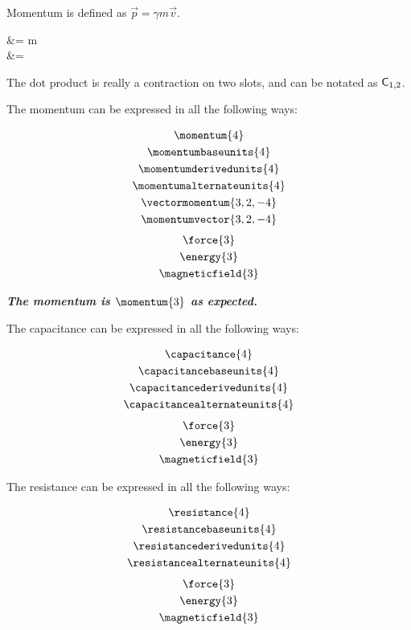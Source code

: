 \documentclass{article}
\begin{document}
Momentum is defined as \( \vec{p} = \gamma m\vec{v}\).

\begin{physicssolution}
   &= \gamma m   \\
   &=  
\end{physicssolution}

The dot product is really a contraction on two slots, and can be notated 
as \( \contraction*{1,2} \).

\newpage
The momentum can be expressed in all the following ways:

\begin{gather*}
 \momentum{4}               \\
 \momentumbaseunits{4}      \\
 \momentumderivedunits{4}   \\
 \momentumalternateunits{4} \\
 \vectormomentum{3,2,-4}    \\
 \momentumvector{3,2,-4}
\end{gather*}
\begin{gather*}
  \force{3}         \\
  \energy{3}        \\
  \magneticfield{3}
\end{gather*}

\bfseries\itshape
The momentum is \( \momentum{3} \) as expected.
\normalfont

The capacitance can be expressed in all the following ways:

\begin{gather*}
 \capacitance{4}               \\
 \capacitancebaseunits{4}      \\
 \capacitancederivedunits{4}   \\
 \capacitancealternateunits{4}
\end{gather*}
\begin{gather*}
  \force{3}         \\
  \energy{3}        \\
  \magneticfield{3}
\end{gather*}

The resistance can be expressed in all the following ways:

\begin{gather*}
 \resistance{4}               \\
 \resistancebaseunits{4}      \\
 \resistancederivedunits{4}   \\
 \resistancealternateunits{4}
\end{gather*}
\begin{gather*}
  \force{3}         \\
  \energy{3}        \\
  \magneticfield{3}
\end{gather*}
\end{document}
